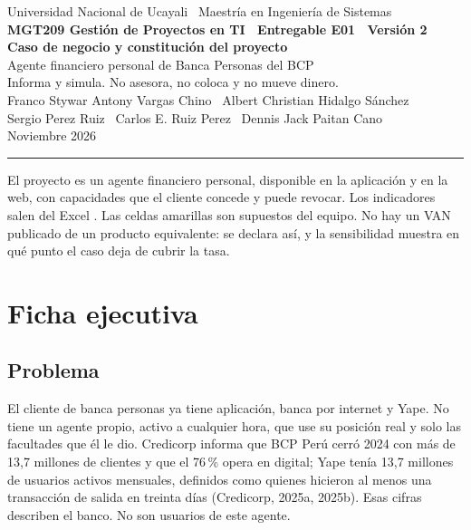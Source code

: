 \documentclass[11pt]{article}
\begin{document}
\begin{center}
{\color{bcp}\small Universidad Nacional de Ucayali \textperiodcentered\ Maestría en Ingeniería de Sistemas}\\[0.3em]
{\color{cobre}\bfseries\small MGT209 Gestión de Proyectos en TI \textperiodcentered\ Entregable E01 \textperiodcentered\ Versión 2}\\[0.6em]
{\color{bcp}\LARGE\bfseries Caso de negocio y constitución del proyecto}\\[0.3em]
{\large Agente financiero personal de Banca Personas del BCP}\\[0.15em]
{\normalsize Informa y simula. No asesora, no coloca y no mueve dinero.}\\[0.45em]
{\small Franco Stywar Antony Vargas Chino \textperiodcentered\ Albert Christian Hidalgo Sánchez}\\[0.15em]
{\small Sergio Perez Ruiz \textperiodcentered\ Carlos E. Ruiz Perez \textperiodcentered\ Dennis Jack Paitan Cano}\\[0.3em]
{\small Noviembre 2026}
\end{center}

\vspace{0.2em}
{\color{cobre}\rule{\textwidth}{0.6pt}}

El proyecto es un agente financiero personal, disponible en la aplicación y en la web, con capacidades que el cliente concede y puede revocar. Los indicadores salen del Excel . Las celdas amarillas son supuestos del equipo. No hay un VAN publicado de un producto equivalente: se declara así, y la sensibilidad muestra en qué punto el caso deja de cubrir la tasa.

\section{Ficha ejecutiva}

\subsection{Problema}

El cliente de banca personas ya tiene aplicación, banca por internet y Yape. No tiene un agente propio, activo a cualquier hora, que use su posición real y solo las facultades que él le dio. Credicorp informa que BCP Perú cerró 2024 con más de 13,7 millones de clientes y que el 76\,\% opera en digital; Yape tenía 13,7 millones de usuarios activos mensuales, definidos como quienes hicieron al menos una transacción de salida en treinta días (Credicorp, 2025a, 2025b). Esas cifras describen el banco. No son usuarios de este agente.
\end{document}
